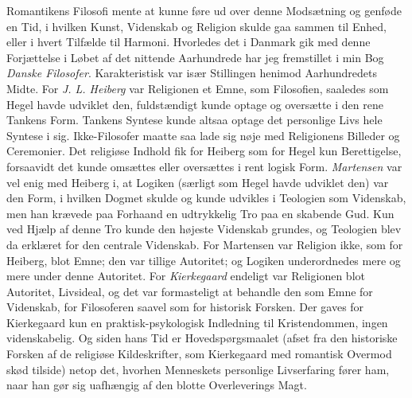 \documentclass[12pt,a4paper]{book}
\newcommand{\opage}[1]{\marginnote{\footnotesize\textit{[#1]}}}
\begin{document}
Romantikens Filosofi mente at kunne føre ud over denne Modsætning og genføde en Tid, i
hvilken Kunst, Videnskab og Religion skulde gaa sammen til Enhed, eller i hvert Tilfælde
til Harmoni. Hvorledes det i Danmark gik med denne Forjættelse i Løbet af det nittende
Aarhundrede har jeg fremstillet i min Bog \emph{Danske Filosofer}. Karakteristisk var især
Stillingen henimod Aarhundredets Midte. For \emph{J. L. Heiberg} var Religionen et Emne, som
Filosofien, saaledes som Hegel havde udviklet den, fuldstændigt kunde optage og oversætte i
den rene Tankens Form. Tankens Syntese kunde altsaa optage det personlige Livs hele Syntese i
sig.
\opage{381}Ikke-Filosofer maatte saa lade sig nøje med Religionens Billeder og Ceremonier. Det religiøse
Indhold fik for Heiberg som for Hegel kun Berettigelse, forsaavidt det kunde omsættes eller
oversættes i rent logisk Form. \emph{Martensen} var vel enig med Heiberg i, at Logiken
(særligt som Hegel havde udviklet den) var den Form, i hvilken Dogmet skulde og kunde
udvikles i Teologien som Videnskab, men han krævede paa Forhaand en udtrykkelig Tro paa en
skabende Gud. Kun ved Hjælp af denne Tro kunde den højeste Videnskab grundes, og Teologien
blev da erklæret for den centrale Videnskab. For Martensen var Religion ikke, som for
Heiberg, blot Emne; den var tillige Autoritet; og Logiken underordnedes mere og mere under
denne Autoritet. For \emph{Kierkegaard} endeligt var Religionen blot Autoritet, Livsideal, og
det var formasteligt at behandle den som Emne for Videnskab, for Filosoferen saavel som for
historisk Forsken. Der gaves for Kierkegaard kun en praktisk-psykologisk Indledning til
Kristendommen, ingen videnskabelig. Og siden hans Tid er Hovedspørgsmaalet (afset fra den
historiske Forsken af de religiøse Kildeskrifter, som Kierkegaard med romantisk Overmod skød
tilside) netop det, hvorhen Menneskets personlige Livserfaring fører ham, naar han gør sig
uafhængig af den blotte Overleverings Magt.
\end{document}
